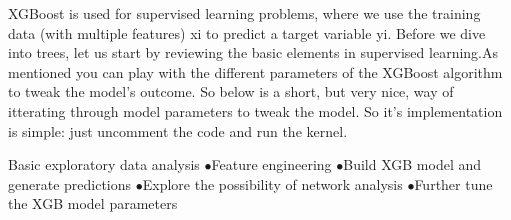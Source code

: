 \documentclass[12pt,report]{ucdavisthesis}
\begin{document}
        \par\hspace{2cm}
        XGBoost is used for supervised learning problems, where we use the training data (with multiple features) xi to predict a target variable yi. Before we dive into trees, let us start by reviewing the basic elements in supervised learning.As mentioned you can play with the different parameters of the XGBoost algorithm to tweak the model's outcome. So below is a short, but very nice, way of itterating through model parameters to tweak the model. So it's implementation is simple: just uncomment the code and run the kernel.
        
      
        Basic exploratory data analysis 
         \newline $\bullet$Feature engineering 
         \newline $\bullet$Build XGB model and generate predictions 
         \newline $\bullet$Explore the possibility of network analysis 
         \newline $\bullet$Further tune the XGB model parameters
          
     
                
\end{document}
